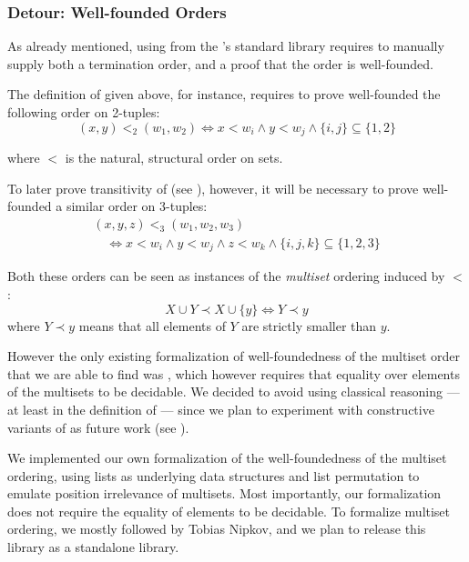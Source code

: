 \subsubsection{Detour: Well-founded Orders}
\label{subsubs:wfo}

As already mentioned, using  from the \Coq's standard library requires to manually supply both a termination order, and a proof that the order is well-founded.

The definition of  given above, for instance, requires to prove well-founded the following order on 2-tuples:
% 
\[ (x, y) <_2 (w_1, w_2) \Leftrightarrow x < w_i \land y < w_j \land \{i,j\}\subseteq\{1,2\} \]

where $<$ is the natural, structural order on \NFO{} sets.

To later prove transitivity of  (see ), however, it will be necessary to prove well-founded a similar order on 3-tuples:
% 
\[\begin{array}{l}
  (x, y, z) <_3 (w_1, w_2, w_3) \\
  \hspace{1em}\Leftrightarrow x < w_i \land y < w_j \land z < w_k \land \{i,j,k\}\subseteq\{1,2,3\}
\end{array}\]

Both these orders can be seen as instances of the \emph{multiset} ordering induced by $<$:
\[ X \cup Y \prec X \cup \{y\} \Leftrightarrow Y \prec y \]
where $Y \prec y$ means that all elements of $Y$ are strictly smaller than $y$.

However the only existing formalization of well-foundedness of the multiset order that we are able to find was \cite{YYY}, which however requires that equality over elements of the multisets to be decidable. We decided to avoid using classical reasoning --- at least in the definition of  --- since we plan to experiment with constructive variants of \NFO{} as future work (see ).

We implemented our own formalization of the well-foundedness of the multiset ordering, using lists as underlying data structures and list permutation to emulate position irrelevance of multisets. Most importantly, our formalization does not require the equality of elements to be decidable. To formalize multiset ordering, we mostly followed \cite{ZZZ} by Tobias Nipkov, and we plan to release this library as a standalone \Coq{} library.


